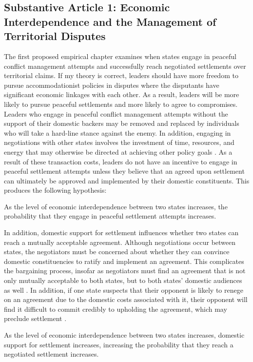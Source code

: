 \subsection{Substantive Article 1: Economic Interdependence and the Management of Territorial Disputes}
The first proposed empirical chapter examines when states engage in peaceful conflict management attempts and successfully reach negotiated settlements over territorial claims. If my theory is correct, leaders should have more freedom to pursue accommodationist policies in disputes where the disputants have significant economic linkages with each other. As a result, leaders will be more likely to pursue peaceful settlements and more likely to agree to compromises. 
Leaders who engage in peaceful conflict management attempts without the support of their domestic backers may be removed and replaced by individuals who will take a hard-line stance against the enemy.
In addition, engaging in negotiations with other states involves the investment of time, resources, and energy that may otherwise be directed at achieving other policy goals \citep{keohane2005}. As a result of these transaction costs, leaders do not have an incentive to engage in peaceful settlement attempts unless they believe that an agreed upon settlement can ultimately be approved and implemented by their domestic constituents. This produces the following hypothesis:

\begin{hypothesis} As the level of economic interdependence between two states increases, the probability that they engage in peaceful settlement attempts increases. \end{hypothesis}

In addition, domestic support for settlement influences whether two states can reach a mutually acceptable agreement. Although negotiations occur between states, the negotiators must be concerned about whether they can convince domestic constituencies to ratify and implement an agreement. This complicates the bargaining process, insofar as negotiators must find an agreement that is not only mutually acceptable to both states, but to both states' domestic audiences as well \citep{putnam1988}. In addition, if one state suspects that their opponent is likely to renege on an agreement due to the domestic costs associated with it, their opponent will find it difficult to commit credibly to upholding the agreement, which may preclude settlement \citep{fearon1998, putnam1988}.

\begin{hypothesis} As the level of economic interdependence between two states increases, domestic support for settlement increases, increasing the probability that they reach a negotiated settlement increases. \end{hypothesis}	
